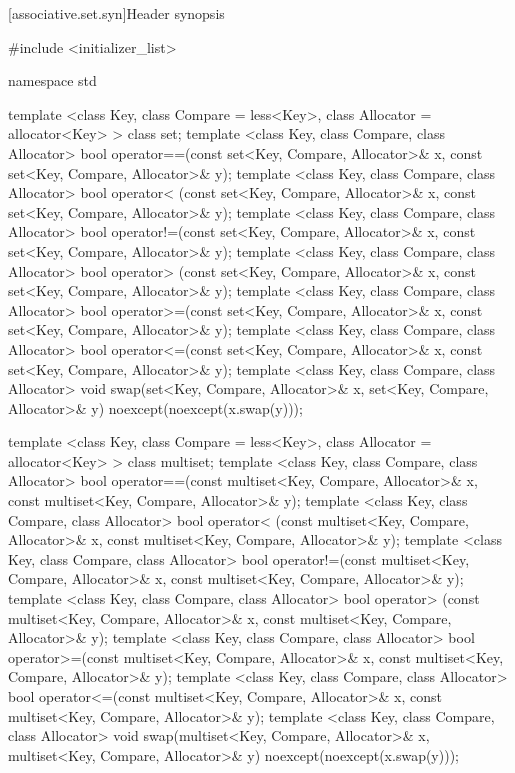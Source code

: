 [associative.set.syn]{Header  synopsis}%

\begin{codeblock}
#include <initializer_list>

namespace std {

  template <class Key, class Compare = less<Key>,
            class Allocator = allocator<Key> >
    class set;
  template <class Key, class Compare, class Allocator>
    bool operator==(const set<Key, Compare, Allocator>& x,
                    const set<Key, Compare, Allocator>& y);
  template <class Key, class Compare, class Allocator>
    bool operator< (const set<Key, Compare, Allocator>& x,
                    const set<Key, Compare, Allocator>& y);
  template <class Key, class Compare, class Allocator>
    bool operator!=(const set<Key, Compare, Allocator>& x,
                    const set<Key, Compare, Allocator>& y);
  template <class Key, class Compare, class Allocator>
    bool operator> (const set<Key, Compare, Allocator>& x,
                    const set<Key, Compare, Allocator>& y);
  template <class Key, class Compare, class Allocator>
    bool operator>=(const set<Key, Compare, Allocator>& x,
                    const set<Key, Compare, Allocator>& y);
  template <class Key, class Compare, class Allocator>
    bool operator<=(const set<Key, Compare, Allocator>& x,
                    const set<Key, Compare, Allocator>& y);
  template <class Key, class Compare, class Allocator>
    void swap(set<Key, Compare, Allocator>& x,
              set<Key, Compare, Allocator>& y)
      noexcept(noexcept(x.swap(y)));

  template <class Key, class Compare = less<Key>,
            class Allocator = allocator<Key> >
    class multiset;
  template <class Key, class Compare, class Allocator>
    bool operator==(const multiset<Key, Compare, Allocator>& x,
                    const multiset<Key, Compare, Allocator>& y);
  template <class Key, class Compare, class Allocator>
    bool operator< (const multiset<Key, Compare, Allocator>& x,
                    const multiset<Key, Compare, Allocator>& y);
  template <class Key, class Compare, class Allocator>
    bool operator!=(const multiset<Key, Compare, Allocator>& x,
                    const multiset<Key, Compare, Allocator>& y);
  template <class Key, class Compare, class Allocator>
    bool operator> (const multiset<Key, Compare, Allocator>& x,
                    const multiset<Key, Compare, Allocator>& y);
  template <class Key, class Compare, class Allocator>
    bool operator>=(const multiset<Key, Compare, Allocator>& x,
                    const multiset<Key, Compare, Allocator>& y);
  template <class Key, class Compare, class Allocator>
    bool operator<=(const multiset<Key, Compare, Allocator>& x,
                    const multiset<Key, Compare, Allocator>& y);
  template <class Key, class Compare, class Allocator>
    void swap(multiset<Key, Compare, Allocator>& x,
              multiset<Key, Compare, Allocator>& y)
      noexcept(noexcept(x.swap(y)));
}
\end{codeblock}

